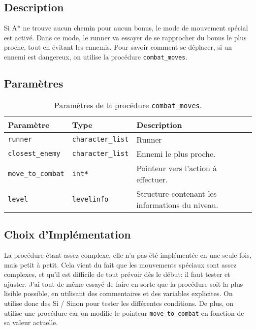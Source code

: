 \subsection{Description}

Si A* ne trouve aucun chemin pour aucun bonus, le mode de mouvement spécial est activé.
Dans ce mode, le runner va essayer de se rapprocher du bonus le plus proche, tout en évitant les ennemis.
Pour savoir comment se déplacer, si un ennemi est dangereux, on utilise la procédure \texttt{combat\_moves}.

\subsection{Paramètres}

\begin{table}[!htpb]
    \begin{tabularx}{\textwidth}{lXX}
        \toprule
        \textbf{Paramètre} & \textbf{Type} & \textbf{Description} \\
        \midrule
        \texttt{runner} & \texttt{character\_list} & Runner \\
        \texttt{closest\_enemy} & \texttt{character\_list} & Ennemi le plus proche. \\
        \texttt{move\_to\_combat} & \texttt{int*} & Pointeur vers l'action à effectuer. \\
        \texttt{level} & \texttt{levelinfo} & Structure contenant les informations du niveau. \\
        \bottomrule
    \end{tabularx}
    \caption{Paramètres de la procédure \texttt{combat\_moves}.}
    \label{tab:parameters-combat_moves}
\end{table}

\subsection{Choix d'Implémentation}

La procédure étant assez complexe, elle n'a pas été implémentée en une seule fois, mais petit à petit.
Cela vient du fait que les mouvements spéciaux sont assez complexes, et qu'il est difficile de tout prévoir dès le début: il faut tester et ajuster.
J'ai tout de même essayé de faire en sorte que la procédure soit la plus lisible possible, en utilisant des commentaires et des variables explicites.
\newline\newline
On utilise donc des Si / Sinon pour tester les différentes conditions.
De plus, on utilise une procédure car on modifie le pointeur \texttt{move\_to\_combat} en fonction de sa valeur actuelle.

